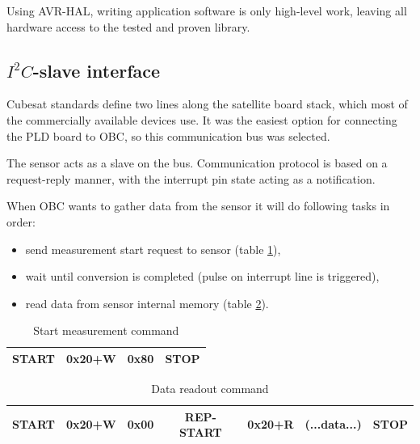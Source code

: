     Using AVR-HAL, writing application software is only high-level work, leaving all hardware access to the tested and proven library.

    \subsection{$I^2C$-slave interface}
    Cubesat standards define two \iic lines along the satellite board stack, which most of the commercially available devices use. It was the easiest option for connecting the PLD board to OBC, so this communication bus was selected.

    The sensor acts as a slave on the \iic bus. Communication protocol is based on a request-reply manner, with the interrupt pin state acting as a notification.

    When OBC wants to gather data from the sensor it will do following tasks in order:
    \begin{itemize}
        \item send measurement start request to sensor (table \ref{Start_measurement_command}),
        \item wait until conversion is completed (pulse on interrupt line is triggered),
        \item read data from sensor internal memory (table \ref{Data_readout_command}).
    \end{itemize}

    \begin{table}[H]
        \caption{Start measurement command}
        \label{Start_measurement_command}
        \begin{center}
            \begin{tabular}{|c|c|c|c|}
                \hline
                START & 0x20+W & 0x80 & STOP \\ \hline
            \end{tabular}
        \end{center}
    \end{table}

    \begin{table}[H]
        \caption{Data readout command}
        \label{Data_readout_command}
        \begin{center}
            \begin{tabular}{|c|c|c|c|c|c|c|}
                \hline
                START & 0x20+W & 0x00 & REP-START & 0x20+R & (...data...) & STOP \\ \hline
            \end{tabular}
        \end{center}
    \end{table}

